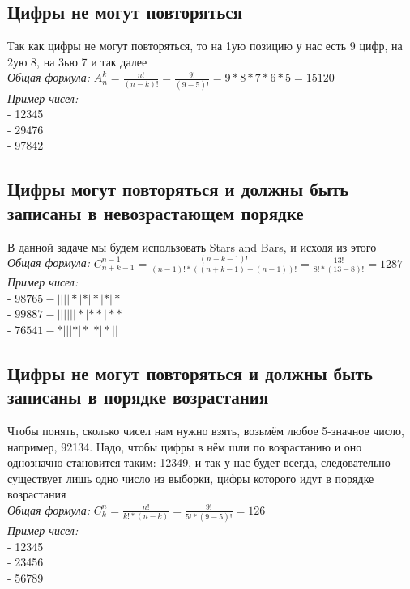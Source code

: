 \documentclass{article}
\begin{document}
        \subsection{Цифры не могут повторяться}
            Так как цифры не могут повторяться, то на 1ую позицию у нас есть 9 цифр, на 2ую 8, на 3ью 7 и так далее\\
            \textit{Общая формула:} $ A^k_n = \frac{n!}{(n-k)!} = \frac{9!}{(9-5)!} = 9*8*7*6*5 = 15120 $\\
            \textit{Пример чисел:}\\
            - 12345\\
            - 29476\\
            - 97842
        \hypertarget{1c}{\subsection{Цифры могут повторяться и должны быть записаны в невозрастающем порядке}}
            В данной задаче мы будем использовать Stars and Bars, и исходя из этого\\
            \textit{Общая формула:} $ C^{n-1}_{n+k-1} = \frac{(n+k-1)!}{(n-1)!*((n+k-1)-(n-1))!} = \frac{13!}{8!*(13-8)!} = 1287 $\\
            \textit{Пример чисел:}\\
            - $98765 - ||||*|*|*|*|*$\\
            - $99887 - ||||||*|**|**$\\
            - $76541 - *|||*|*|*|*||$
        \subsection{Цифры не могут повторяться и должны быть записаны в порядке возрастания}
            Чтобы понять, сколько чисел нам нужно взять, возьмём любое 5-значное число, например, 92134. Надо, чтобы цифры в нём шли по возрастанию и оно однозначно становится таким: 12349, и так у нас будет всегда, следовательно существует лишь одно число из выборки, цифры которого идут в порядке возрастания\\
            \textit{Общая формула:} $ C^n_k = \frac{n!}{k!*(n-k)} = \frac{9!}{5!*(9-5)!} = 126 $\\
            \textit{Пример чисел:}\\
            - 12345\\
            - 23456\\
            - 56789
\end{document}
